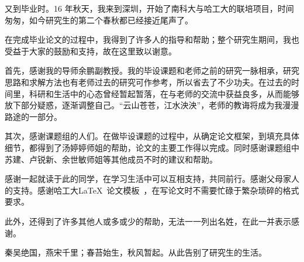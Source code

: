 \begin{acknowledgements}

又到毕业时。16 年秋天，我来到深圳，开始了南科大与哈工大的联培项目，时间匆匆，如今研究生的第二个春秋都已经接近尾声了。

在完成毕业论文的过程中，我得到了许多人的指导和帮助；整个研究生期间，我也受益于大家的鼓励和支持，故在这里致以谢意。

首先，感谢我的导师余鹏副教授。我的毕设课题和老师之前的研究一脉相承，研究思路和求解方法也有老师过去的研究可作参考，所以省去了不少功夫。在过去的时间里，科研和生活中的心态曾经暂起暂落，在与老师的交流中获益良多，从而能够放下部分疑惑，逐渐调整自己。“云山苍苍，江水泱泱”，老师的教诲将成为我漫漫路途的一部分。

其次，感谢课题组的人们。在做毕设课题的过程中，从确定论文框架，到填充具体细节，都得到了汤婷婷师姐的帮助，论文的主要工作得以完成。同时感谢课题组中苏建、卢锐新、余世敏师姐等其他成员不时的建议和帮助。

感谢一起就读于此的同学，在学习生活中可以互相支持，共同前行。感谢父母家人的支持。感谢哈工大\LaTeX\ 论文模板\hithesis\ ，在写论文时不需要忙碌于繁杂琐碎的格式要求。

此外，还得到了许多其他人或多或少的帮助，无法一一列出名姓，在此一并表示感谢。

秦吴绝国，燕宋千里；春苔始生，秋风暂起。从此告别了研究生的生活。

\end{acknowledgements}
